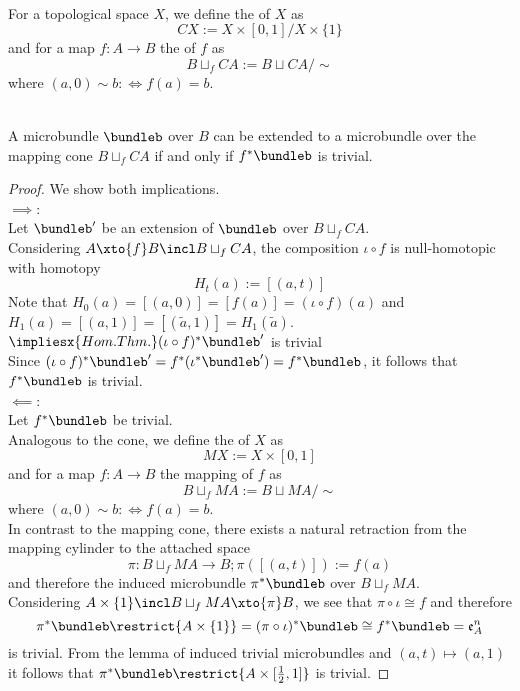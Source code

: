 \\ For a topological space $X$, we define the  of $X$ as 
\[ CX := X \times [0, 1] / X \times \{1\} \]
and for a map $f: A \to B$ the  of $f$ as
\[ B \sqcup_f CA := B \sqcup CA / \sim \]
where $(a, 0) \sim b :\iff f(a) = b$.

\\ A microbundle $\bundleb$ over $B$ can be extended to a microbundle over the mapping cone $B \sqcup_f CA$ if and only if $f^*\bundleb$ is trivial.
\begin{proof}
    We show both implications.
    \\ $\implies$:
    \\ Let $\bundleb'$ be an extension of $\bundleb$ over $B \sqcup_f CA$.
    \\ Considering $A \xto{f} B \incl B \sqcup_f CA$, the composition $\iota \circ f$ is null-homotopic with homotopy
    \[ H_t(a) := [(a, t)] \]
    Note that $H_0(a) = [(a, 0)] = [f(a)] = (\iota \circ f)(a)$ and $H_1(a) = [(a, 1)] = [(\tilde{a}, 1)] = H_1(\tilde{a})$.
    \\ $\impliesx{Hom. Thm.} (\iota \circ f)^*\bundleb'$ is trivial
    \\ Since $(\iota \circ f)^*\bundleb' = f^*(\iota^*\bundleb') = f^*\bundleb$, it follows that $f^*\bundleb$ is trivial.
    \\ $\impliedby$:
    \\ Let $f^*\bundleb$ be trivial.
    \\ Analogous to the cone, we define the  of $X$ as
    \[ MX := X \times [0, 1] \]
    and for a map $f: A \to B$ the mapping  of $f$ as
    \[ B \sqcup_f MA := B \sqcup MA / \sim \]
    where $(a, 0) \sim b :\iff f(a) = b$.
    \\ In contrast to the mapping cone, there exists a natural retraction from the mapping cylinder to the attached space
    \[ \pi: B \sqcup_f MA \to B; \pi([(a, t)]) := f(a) \]
    and therefore the induced microbundle $\pi^*\bundleb$ over $B \sqcup_f MA$.
    \\ Considering $A \times \{1\} \incl B \sqcup_f MA \xto{\pi} B$, we see that $\pi \circ \iota \cong f$ and therefore
    \[ \pi^*\bundleb\restrict{A \times \{1\}} = (\pi \circ \iota)^*\bundleb \cong f^*\bundleb = \mathfrak{e}^n_A\]
    is trivial. From the lemma of induced trivial microbundles and $(a, t) \mapsto (a, 1)$ it follows that $\pi^*\bundleb\restrict{A \times [\frac{1}{2}, 1]}$ is trivial.

\end{proof}
